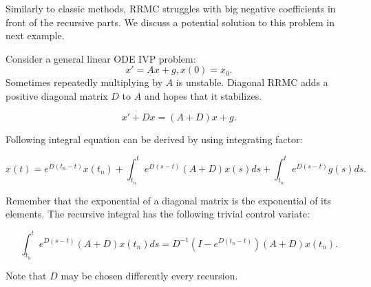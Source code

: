 \documentclass[a4paper,12pt]{article}
\begin{document}
Similarly to classic methods, RRMC struggles with big negative coefficients in front
of the recursive parts. We discuss a potential solution to this  problem in next example.

\begin{definition}[DRRMC]
    Consider a general linear ODE IVP problem:
    \begin{equation}
        x' = Ax+g, x(0)= x_{0}.
    \end{equation}
    Sometimes repeatedly multiplying by $A$ is unstable.
    Diagonal RRMC adds a positive diagonal matrix $D$
    to $A$ and hopes that it stabilizes.

    \begin{equation}
        x' + Dx = (A+D)x+g.
    \end{equation}

    Following integral equation can be derived by using integrating factor:

    \begin{equation}
        x(t)= e^{D(t_{n}-t)}x(t_{n}) + \int_{t_{n}}^{t} e^{D(s-t)}(A+D)x(s)ds+\int_{t_{n}}^{t} e^{D(s-t)}g(s)ds.
    \end{equation}

    Remember that the exponential of a diagonal matrix is the exponential of its elements.
    The recursive integral has the following trivial control variate:

    \begin{equation}
        \int_{t_{n}}^{t}  e^{D(s-t)}(A+D)x(t_{n})ds = D^{-1}(I-e^{D(t_{n}-t)})(A+D)x(t_{n}).
    \end{equation}

    Note that $D$ may be chosen differently every recursion.
\end{definition}



\end{document}
